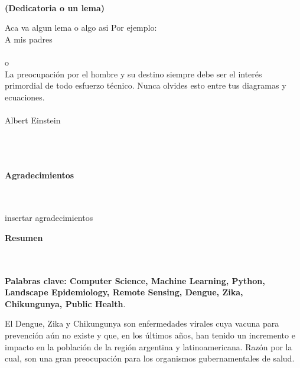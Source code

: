 \newpage
\thispagestyle{empty} \textbf{}\normalsize
\\\\\\%
\textbf{(Dedicatoria o un lema)}\\[4.0cm]

\begin{flushright}
\begin{minipage}{8cm}
    \noindent
        \small
        Aca va algun lema o algo asi
        Por ejemplo:\\[1.0cm]
        A mis padres\\[1.0cm]\\
        o\\[1.0cm]
        La preocupaci\'{o}n por el hombre y su destino siempre debe ser el
        inter\'{e}s primordial de todo esfuerzo t\'{e}cnico. Nunca olvides esto
        entre tus diagramas y ecuaciones.\\\\
        Albert Einstein\\
\end{minipage}
\end{flushright}

\newpage{\pagestyle{empty}\cleardoublepage}

\newpage
\thispagestyle{empty} \textbf{}\normalsize
\\\\\\%
\textbf{\LARGE Agradecimientos}
\\\\
insertar agradecimientos

\newpage{\pagestyle{empty}\cleardoublepage}

\newpage
\textbf{\LARGE Resumen}
\\\\

\textbf{\small Palabras clave: Computer Science, Machine Learning, Python,
      Landscape Epidemiology, Remote Sensing, Dengue, Zika, Chikungunya, Public Health}.\\
\justifying
  \par El Dengue, Zika y Chikungunya son enfermedades virales cuya vacuna para
    prevención aún no existe y que, en los últimos años, han tenido un incremento
    e impacto en la población de la región argentina y latinoamericana. Razón
    por la cual, son
    una gran preocupación para los organismos gubernamentales de salud.

